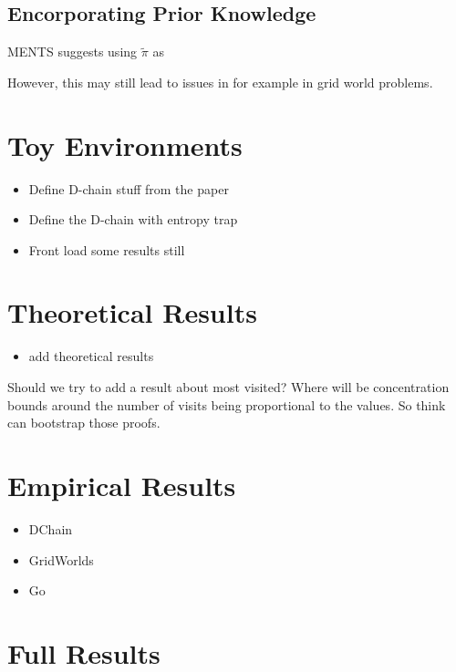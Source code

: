    \subsection{Encorporating Prior Knowledge}


        MENTS suggests using $\tilde{\pi}$ as 

        However, this may still lead to issues in for example in grid world problems. 





\section{Toy Environments}
\label{sec:4-3-toyenvs}

    \begin{itemize}
        \item Define D-chain stuff from the paper
        \item Define the D-chain with entropy trap
        \item Front load some results still
    \end{itemize}

\section{Theoretical Results}
\label{sec:4-4-theory}

    \begin{itemize}
        \item add theoretical results
    \end{itemize}

    Should we try to add a result about most visited? Where will be concentration bounds around the number of visits being proportional to the values. So think can bootstrap those proofs.

\section{Empirical Results}
\label{sec:4-5-results}

    \begin{itemize}
        \item DChain
        \item GridWorlds
        \item Go
    \end{itemize}

\section{Full Results}
\label{sec:4-6-fullresults}

